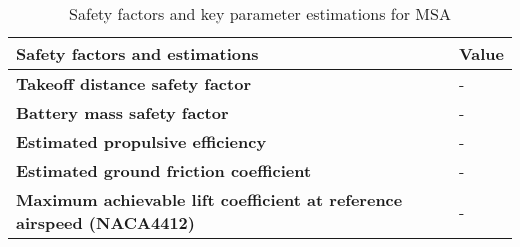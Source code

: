 \begin{table}[H]
\centering

    \begin{tabular}{@{}ll@{}}
    \toprule
    \textbf{Safety factors and estimations}                                       & \textbf{Value} \\ \midrule
    \textbf{Takeoff distance safety factor}                                       & -          \\
    \textbf{Battery mass safety factor}                                           & -         \\
    \textbf{Estimated propulsive efficiency}                                      & -          \\
    \textbf{Estimated ground friction coefficient}                                & -        \\
    \textbf{Maximum achievable lift coefficient at reference airspeed (NACA4412)} & -         \\ \bottomrule
    \end{tabular}
\caption{Safety factors and key parameter estimations for MSA}
\label{tab: msa_safety}
\end{table}